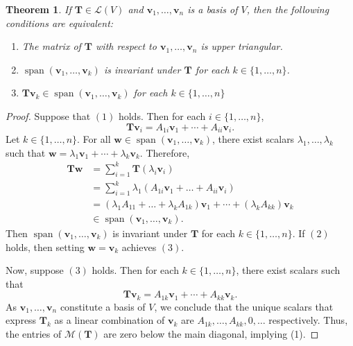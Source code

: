 \documentclass[11pt]{article}
\renewcommand{\vec}[1]{\mathbf{#1}}
\newcommand{\mat}[1]{\mathbf{#1}}
\newcommand{\Span}{\operatorname{span}}
\newtheorem{theorem}{Theorem}
\begin{document}
\begin{theorem}
	If $\mat{T} \in \mathcal{L}(V)$ and $\vec{v}_{1}, \ldots, \vec{v}_{n}$ is a basis of $V$, then the following conditions are equivalent:
	\begin{enumerate}
		\item The matrix of $\mat{T}$ with respect to $\vec{v}_{1}, \ldots, \vec{v}_{n}$ is upper triangular.
		\item $\Span (\vec{v}_{1}, \ldots, \vec{v}_{k})$ is invariant under $\mat{T}$ for each $k \in \{ 1, \ldots, n \}$.
		\item $\mat{T} \vec{v}_{k} \in \Span (\vec{v}_{1}, \ldots, \vec{v}_{k})$ for each $k \in \{ 1, \ldots, n \}$
	\end{enumerate}
\end{theorem}
\begin{adjustwidth}{1cm}{}
	\begin{proof}
		Suppose that $(1)$ holds. Then for each $i \in \{ 1, \ldots, n \}$,
		\[
			\mat{T} \vec{v}_{i} = A_{1i} \vec{v}_{1} + \cdots + A_{ii} \vec{v}_{i}.
		\]
		Let $k \in \{ 1, \ldots, n \}$. For all $\vec{w} \in \Span(\vec{v}_{1}, \ldots, \vec{v}_{k})$, there exist scalars $\lambda_{1}, \ldots, \lambda_{k}$ such that $\vec{w} = \lambda_{1} \vec{v}_{1} + \cdots + \lambda_{k} \vec{v}_{k}$. Therefore,
		\begin{align*}
			\vec{T} \vec{w} &= \sum\limits_{i = 1}^{k} \mat{T} (\lambda_{i}\vec{v}_{i}) \\
							&= \sum\limits_{i = 1}^{k} \lambda_{1} (A_{1i} \vec{v}_{1} + \ldots + A_{ii} \vec{v}_{i}) \\
							&= (\lambda_{1} A_{11} + \ldots + \lambda_{k}A_{1k}) \vec{v}_{1} + \cdots + (\lambda_{k} A_{kk}) \vec{v}_{k}  \\
							&\in \Span(\vec{v}_{1}, \ldots, \vec{v}_{k}). 
		\end{align*}
		Then $\Span(\vec{v}_{1}, \ldots, \vec{v}_{k})$ is invariant under $\mat{T}$ for each $k \in \{ 1, \ldots, n \}$. If $(2)$ holds, then setting $\vec{w} = \vec{v}_{k}$ achieves $(3)$.

		Now, suppose $(3)$ holds. Then for each $k \in \{ 1, \ldots, n \}$, there exist scalars such that
		\[
			\mat{T} \vec{v}_{k} = A_{1k} \vec{v}_{1} + \cdots + A_{kk} \vec{v}_{k}.
		\]
		As $\vec{v}_{1}, \ldots, \vec{v}_{n}$ constitute a basis of $V$, we conclude that the unique scalars that express $\mat{T}_{k}$ as a linear combination of $\vec{v}_{k}$ are $A_{1k}, \ldots, A_{kk}, 0, \ldots$ respectively. Thus, the entries of $\mathcal{M}(\mat{T})$ are zero below the main diagonal, implying (1).
	\end{proof}
\end{adjustwidth}
\end{document}
